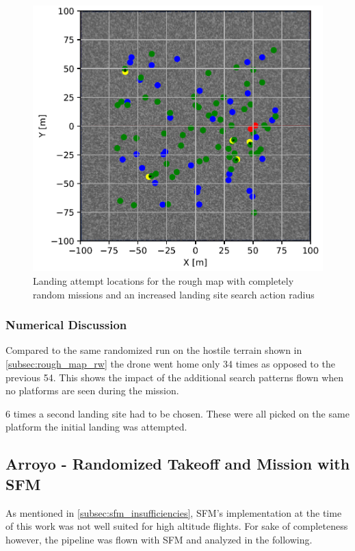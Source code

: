     \begin{figure}[h]
    \centering
    \includegraphics[scale=0.5]{images/evaluation/landing_rough_rand_lr.png}
    \caption{Landing attempt locations for the rough map with completely random missions and an increased landing site search action radius}
    \label{fig:land_rough_rand_radius}
    \end{figure}

    \subsubsection{Numerical Discussion}

    Compared to the same randomized run on the hostile terrain shown in \cref{subsec:rough_map_rw} the drone went home only 34 times as opposed to the previous 54. This shows the impact of the additional search patterns flown when no platforms are seen during the mission. 

    6 times a second landing site had to be chosen. These were all picked on the same platform the initial landing was attempted. 
    

\subsection{Arroyo - Randomized Takeoff and Mission with SFM}\label{subsec:SFM_complete_rand}

    As mentioned in \cref{subsec:sfm_insufficiencies}, SFM's implementation at the time of this work was not well suited for high altitude flights. For sake of completeness however, the pipeline was flown with SFM and analyzed in the following. 

